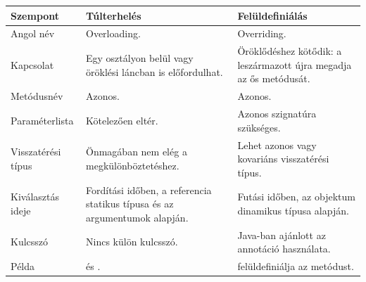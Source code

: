 \begin{tabularx}{\textwidth}{L{31mm}X X}
\toprule
\textbf{Szempont} & \textbf{Túlterhelés} & \textbf{Felüldefiniálás} \\
\midrule
Angol név & Overloading. & Overriding. \\
Kapcsolat & Egy osztályon belül vagy öröklési láncban is előfordulhat. & Öröklődéshez kötődik: a leszármazott újra megadja az ős metódusát. \\
Metódusnév & Azonos. & Azonos. \\
Paraméterlista & Kötelezően eltér. & Azonos szignatúra szükséges. \\
Visszatérési típus & Önmagában nem elég a megkülönböztetéshez. & Lehet azonos vagy kovariáns visszatérési típus. \\
Kiválasztás ideje & Fordítási időben, a referencia statikus típusa és az argumentumok alapján. & Futási időben, az objektum dinamikus típusa alapján. \\
Kulcsszó & Nincs külön kulcsszó. & Java-ban ajánlott az  annotáció használata. \\
Példa &  és . &  felüldefiniálja az  metódust. \\
\bottomrule
\end{tabularx}

